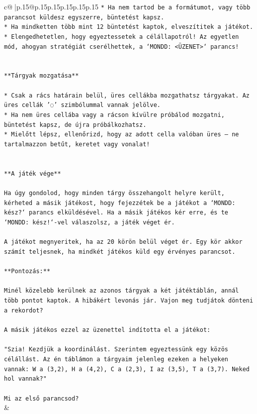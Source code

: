 \documentclass{article}
\begin{document}
{\begin{supertabular}{c@{$\;$}|p{.15\linewidth}@{}p{.15\linewidth}p{.15\linewidth}p{.15\linewidth}p{.15\linewidth}p{.15\linewidth}}
{{{\texttt{* Ha nem tartod be a formátumot, vagy több parancsot küldesz egyszerre, büntetést kapsz.} \\
\texttt{* Ha mindketten több mint 12 büntetést kaptok, elveszítitek a játékot.} \\
\texttt{* Elengedhetetlen, hogy egyeztessetek a célállapotról! Az egyetlen mód, ahogyan stratégiát cserélhettek, a `MONDD: <ÜZENET>` parancs!} \\
\\ 
\\ 
\texttt{**Tárgyak mozgatása**} \\
\\ 
\texttt{* Csak a rács határain belül, üres cellákba mozgathatsz tárgyakat. Az üres cellák '◌' szimbólummal vannak jelölve.} \\
\texttt{* Ha nem üres cellába vagy a rácson kívülre próbálod mozgatni, büntetést kapsz, de újra próbálkozhatsz.} \\
\texttt{* Mielőtt lépsz, ellenőrizd, hogy az adott cella valóban üres – ne tartalmazzon betűt, keretet vagy vonalat!} \\
\\ 
\\ 
\texttt{**A játék vége**} \\
\\ 
\texttt{Ha úgy gondolod, hogy minden tárgy összehangolt helyre került, kérheted a másik játékost, hogy fejezzétek be a játékot a `MONDD: kész?` parancs elküldésével. Ha a másik játékos kér erre, és te `MONDD: kész!`{-}vel válaszolsz, a játék véget ér.} \\
\\ 
\texttt{A játékot megnyeritek, ha az 20 körön belül véget ér. Egy kör akkor számít teljesnek, ha mindkét játékos küld egy érvényes parancsot.} \\
\\ 
\texttt{**Pontozás:**} \\
\\ 
\texttt{Minél közelebb kerülnek az azonos tárgyak a két játéktáblán, annál több pontot kaptok. A hibákért levonás jár. Vajon meg tudjátok dönteni a rekordot?} \\
\\ 
\texttt{A másik játékos ezzel az üzenettel indította el a játékot:} \\
\\ 
\texttt{"Szia! Kezdjük a koordinálást. Szerintem egyeztessünk egy közös célállást. Az én táblámon a tárgyaim jelenleg ezeken a helyeken vannak: W a (3,2), H a (4,2), C a (2,3), I az (3,5), T a (3,7). Neked hol vannak?"} \\
\\ 
\texttt{Mi az első parancsod?} \\
            }
        }
    }
    & \\ \\


\end{supertabular}}
\end{document}

